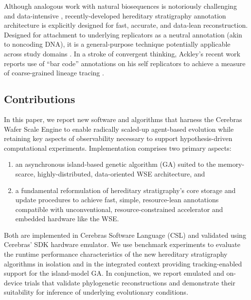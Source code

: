 Although analogous work with natural biosequences is notoriously challenging and data-intensive \citep{neyman1971molecular,lemmon2013high},
recently-developed hereditary stratigraphy annotation architecture is explicitly designed for fast, accurate, and data-lean reconstruction.
Designed for attachment to underlying replicators as a neutral annotation (akin to noncoding DNA), it is a general-purpose technique potentially applicable across study domains \citep{liben2008tracing,cohen1987computer,friggeri2014rumor}.
In a stroke of convergent thinking, Ackley's recent work reports use of ``bar code'' annotations on his self replicators to achieve a measure of coarse-grained lineage tracing \citep{ackley2023robust}.

\subsection{Contributions}

In this paper, we report new software and algorithms that harness the Cerebras Wafer Scale Engine to enable radically scaled-up agent-based evolution while retaining key aspects of observability necessary to support hypothesis-driven computational experiments.
Implementation comprises two primary aspects:
\begin{enumerate}
  \item an asynchronous island-based genetic algorithm (GA) suited to the memory-scarce, highly-distributed, data-oriented WSE architecture, and
  \item a fundamental reformulation of hereditary stratigraphy's core storage and update procedures to achieve fast, simple, resource-lean annotations compatible with unconventional, resource-constrained accelerator and embedded hardware like the WSE.
\end{enumerate}

Both are implemented in Cerebras Software Language (CSL) and validated using Cerebras' SDK hardware emulator.
We use benchmark experiments to evaluate the runtime performance characteristics of the new hereditary stratigraphy algorithms in isolation and in the integrated context providing tracking-enabled support for the island-model GA.
In conjunction, we report emulated and on-device trials that validate phylogenetic reconstructions and demonstrate their suitability for inference of underlying evolutionary conditions.

